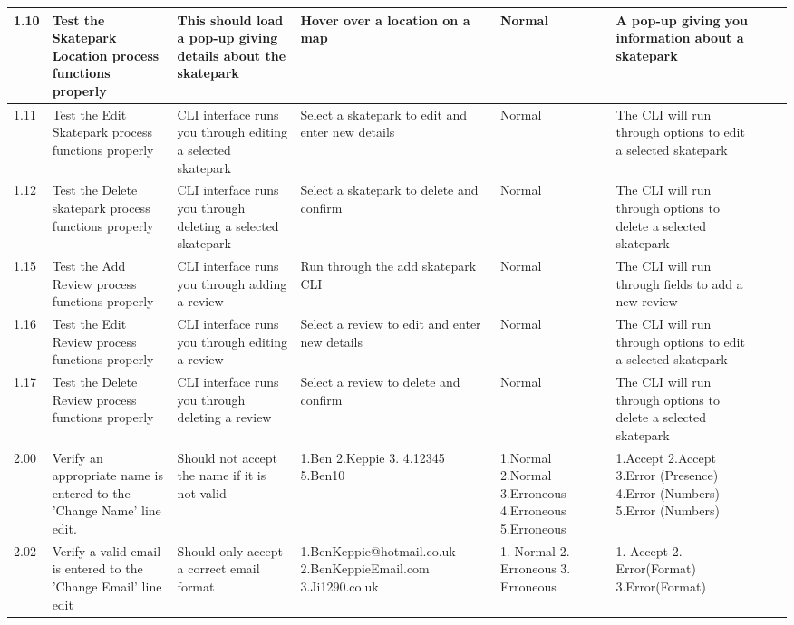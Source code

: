 \begin{landscape}
\begin{center}
\begin{longtable}{|p{1.5cm}|p{2.5cm}|p{2.5cm}|p{2cm}|p{2cm}|p{2cm}|p{2cm}|p{2cm}|}
1.10 & Test the Skatepark Location process functions properly & This should load a pop-up giving details about the skatepark & Hover over a location on a map & Normal & A pop-up giving you information about a skatepark & & \\ \hline

1.11 & Test the Edit Skatepark process functions properly & CLI interface runs you through editing a selected skatepark & Select a skatepark to edit and enter new details & Normal & The CLI will run through options to edit a selected skatepark &  & \\ \hline

1.12 &  Test the Delete skatepark process functions properly & CLI interface runs you through deleting a selected skatepark & Select a skatepark to delete and confirm & Normal & The CLI will run through options to delete a selected skatepark & & \\ \hline


1.15 & Test the Add Review process functions properly &   CLI interface runs you through adding a review & Run through the add skatepark CLI & Normal & The CLI will run through fields to add a new review & &  \\ \hline

1.16 & Test the Edit Review process functions properly & CLI interface runs you through editing a review &  Select a review to edit and enter new details & Normal & The CLI will run through options to edit a selected skatepark &  & \\ \hline

1.17  & Test the Delete Review process functions properly &  CLI interface runs you through deleting a review &  Select a review to delete and confirm & Normal & The CLI will run through options to delete a selected skatepark & &  \\ \hline




2.00 & Verify an appropriate name is entered to the 'Change Name' line edit. & Should not accept the name if it is not valid & 1.Ben 2.Keppie 3.   4.12345  5.Ben10 & 1.Normal 2.Normal 3.Erroneous 4.Erroneous 5.Erroneous & 1.Accept 2.Accept 3.Error (Presence) 4.Error (Numbers) 5.Error (Numbers) & & \\ \hline

2.02 & Verify a valid email is entered to the 'Change Email' line edit & Should only accept a correct email format & 1.BenKeppie@hotmail.co.uk 2.BenKeppieEmail.com  3.Ji1290.co.uk & 1. Normal 2. Erroneous 3. Erroneous & 1. Accept 2. Error(Format) 3.Error(Format) & & \\ \hline





\end{longtable}
\end{center}
\end{landscape}
